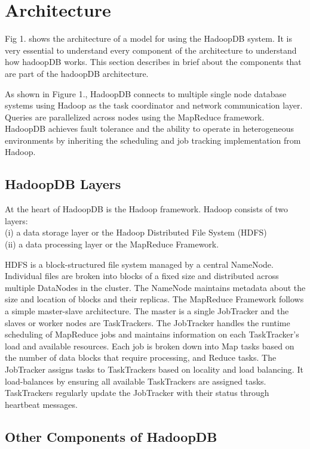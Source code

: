 \documentclass[9pt,twocolumn,twoside]{../../styles/osajnl}
\begin{document}
\section{Architecture}

Fig 1. shows the architecture\cite{hadoop-guide} of a model for using the HadoopDB system. It is very essential to understand every component of the architecture to understand how hadoopDB works. This section describes in brief about the components that are part of the hadoopDB architecture.

As shown in Figure 1., HadoopDB connects to multiple single node database systems using Hadoop as the task coordinator and network communication layer. Queries are parallelized across nodes using the MapReduce framework. HadoopDB achieves fault tolerance and the ability to operate in heterogeneous environments by
inheriting the scheduling and job tracking implementation from Hadoop.

\subsection{HadoopDB Layers}
At the heart of HadoopDB is the Hadoop\cite{apache-hadoop} framework. Hadoop consists of two layers: \\(i) a data storage layer or the Hadoop \cite{apace-web-page} Distributed
File System (HDFS) \\(ii) a data processing layer or the MapReduce Framework.

HDFS\cite{hadoop-cluster-setup} is a block-structured file system managed by a central NameNode. Individual files are broken into blocks of a fixed size and distributed across multiple DataNodes in the cluster. The
NameNode maintains metadata about the size and location of blocks and their replicas.
The MapReduce Framework follows a simple master-slave architecture. The master is a single JobTracker and the slaves or worker nodes are TaskTrackers. The JobTracker handles the runtime
scheduling of MapReduce jobs and maintains information on each TaskTracker’s load and available resources. Each job is broken down into Map tasks based on the number of data blocks that
require processing, and Reduce tasks. The JobTracker assigns tasks to TaskTrackers based on locality and load balancing. It load-balances by ensuring all available TaskTrackers are assigned tasks. TaskTrackers regularly update the JobTracker with their status through heartbeat messages.


\subsection{Other Components of HadoopDB}
\end{document}
